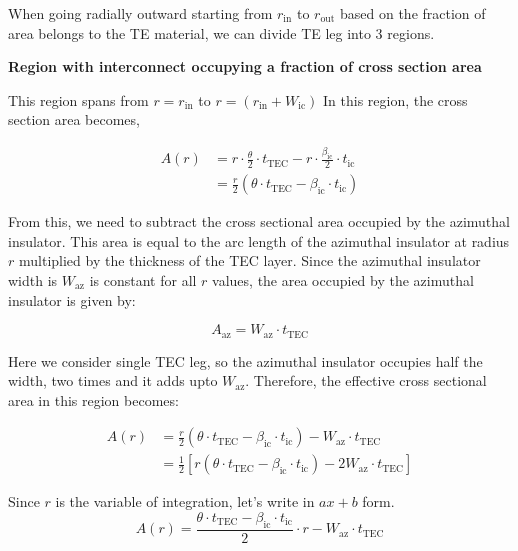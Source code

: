 \documentclass[10pt,a4paper,twocolumn]{article}
\begin{document}
When going radially outward starting from $r_{\text{in}}$ to $r_{\text{out}}$ based on the fraction of area belongs to the TE material, we can divide TE leg into 3 regions.

\textbf{Region with interconnect occupying a fraction of cross section area}

This region spans from $r=r_{\text{in}}$ to $r=(r_{\text{in}}+W_{\text{ic}})$ In this region, the cross section area becomes,

\begin{equation}
	\begin{aligned}
		A(r) & = r\cdot \frac{\theta}{2} \cdot t_{\text{TEC}} - r \cdot \frac{\beta_{\text{ic}}}{2} \cdot t_{\text{ic}} \\
		     & = \frac{r}{2} (\theta \cdot t_{\text{TEC}} - \beta_{\text{ic}} \cdot t_{\text{ic}} )
	\end{aligned}
\end{equation}

From this, we need to subtract the cross sectional area occupied by the azimuthal insulator. This area is equal to the arc length of the azimuthal insulator at radius $r$ multiplied by the thickness of the TEC layer. Since the azimuthal insulator width is $W_{\text{az}}$ is constant for all $r$ values, the area occupied by the azimuthal insulator is given by:

\begin{equation}
	A_{\text{az}} = W_{\text{az}} \cdot t_{\text{TEC}}
\end{equation}

Here we consider single TEC leg, so the azimuthal insulator occupies half the width, two times and it adds upto $W_{\text{az}}$. Therefore, the effective cross sectional area in this region becomes:

\begin{equation*}
	\begin{aligned}
		A(r) & = \frac{r}{2} (\theta \cdot t_{\text{TEC}} - \beta_{\text{ic}} \cdot t_{\text{ic}} ) - W_{\text{az}} \cdot t_{\text{TEC}}                    \\
		     & = \frac{1}{2} \left[ r (\theta \cdot t_{\text{TEC}} - \beta_{\text{ic}} \cdot t_{\text{ic}} ) - 2 W_{\text{az}} \cdot t_{\text{TEC}} \right]
	\end{aligned}
\end{equation*}

Since $r$ is the variable of integration, let's write in $ax+b$ form.
\begin{equation}
	A(r) = \frac{\theta \cdot t_{\text{TEC}}- \beta_{\text{ic}} \cdot t_{\text{ic}}}{2} \cdot r - W_{\text{az}} \cdot t_{\text{TEC}}
	\label{eq:area_TE_ic}
\end{equation}
\end{document}

